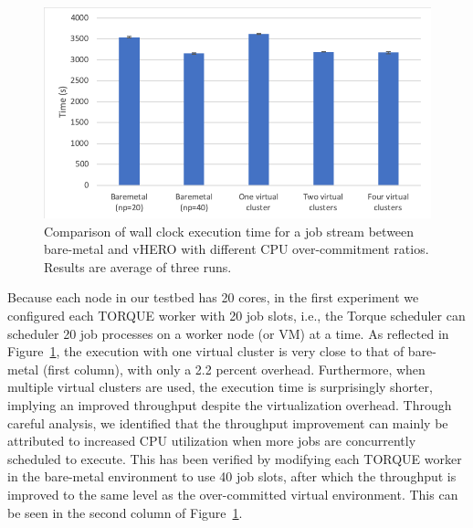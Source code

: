 \begin{figure}[!t]
   \begin{center}
       \includegraphics[width=\columnwidth]{Figures/cpu_exe_time}
   \end{center}
   \caption{Comparison of wall clock execution time for a job stream between bare-metal and vHERO with different CPU over-commitment ratios. Results are average of three runs.}
   \label{fig:cpu_exe_time}
 \end{figure}

Because each node in our testbed has 20 cores, in the first experiment we configured each TORQUE worker with 20 job slots, i.e., the Torque scheduler can scheduler 20 job processes on a worker node (or VM) at a time. As reflected in Figure~\ref{fig:cpu_exe_time}, the execution with one virtual cluster is very close to that of bare-metal (first column), with only a 2.2 percent overhead. Furthermore, when multiple virtual clusters are used, the execution time is surprisingly shorter, implying an improved throughput despite the virtualization overhead. Through careful analysis, we identified that the throughput improvement can mainly be attributed to increased CPU utilization when more jobs are concurrently scheduled to execute. This has been verified by modifying each TORQUE worker in the bare-metal environment to use 40 job slots, after which the throughput is improved to the same level as the over-committed virtual environment. This can be seen in the second column of Figure~\ref{fig:cpu_exe_time}.

